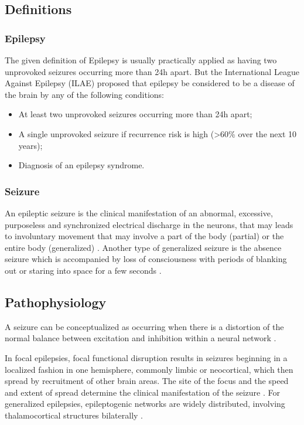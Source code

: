   \subsection*{Definitions}
    \subsubsection*{Epilepsy}
    The given definition of Epilepsy is usually practically applied as having two unprovoked seizures occurring more than 24h apart. But the International League Against Epilepsy (ILAE) proposed that epilepsy be considered to be a disease of the brain by any of the following conditions: \cite{defEpilepsy}

    \begin{itemize}
      \item At least two unprovoked seizures occurring more than 24h apart;
      \item A single unprovoked seizure if recurrence risk is high (>60\% over the next 10 years);
      \item Diagnosis of an epilepsy syndrome.
    \end{itemize}
    \subsubsection*{Seizure}
    An epileptic seizure is the clinical manifestation of an abnormal, excessive, purposeless and synchronized electrical discharge in the neurons, that may leads to involuntary movement that may involve a part of the body (partial) or the entire body (generalized) \cite{WHO}. Another type of generalized seizure is the absence seizure which is accompanied by loss of consciousness with periods of blanking out or staring into space for a few seconds \cite{AbsenceS25:online}.

  \subsection*{Pathophysiology}
  A seizure can be conceptualized as occurring when there is a distortion of the normal balance between excitation and inhibition within a neural network \cite{pathophysiology}. 
  
  In focal epilepsies, focal functional disruption results in seizures beginning in a localized fashion in one hemisphere,
  commonly limbic or neocortical, which then spread by recruitment of other brain areas. The site of the focus and the speed and extent of spread determine the clinical manifestation of the seizure \cite{DUNCAN2006, classification}. For generalized epilepsies, epileptogenic networks are widely distributed, involving thalamocortical structures bilaterally \cite{classification}.


